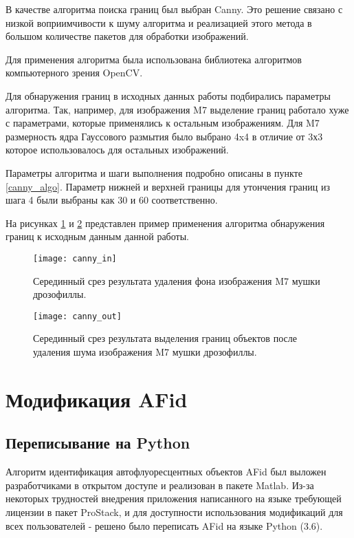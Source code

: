 В качестве алгоритма поиска границ был выбран Canny. Это решение связано с низкой воприимчивости к шуму алгоритма и реализацией этого метода в большом количестве пакетов для обработки изображений.

Для применения алгоритма была использована библиотека алгоритмов компьютерного зрения OpenCV. \cite{Booklet}

Для обнаружения границ в исходных данных работы подбирались параметры алгоритма. Так, например, для изображения M7 выделение границ работало хуже с параметрами, которые применялись к остальным изображениям. Для M7 размерность ядра Гауссового размытия было выбрано 4x4 в отличие от 3х3 которое использовалось для остальных изображений.

Параметры алгоритма и шаги выполнения подробно описаны в пункте \ref{canny_algo}. Параметр нижней и верхней границы для утончения границ из шага 4 были выбраны как 30 и 60 соответственно.

На рисунках \ref{canny_in} и \ref{canny_out} представлен пример применения алгоритма обнаружения границ к исходным данным данной работы.

\begin{figure}[H]
	\centering
	\texttt{[image: canny\_in]}
	\caption{Серединный срез результата удаления фона изображения M7 мушки дрозофиллы.}
	\label{canny_in}
\end{figure}

\begin{figure}[H]
	\centering
	\texttt{[image: canny\_out]}
	\caption{Серединный срез результата выделения границ объектов после удаления шума изображения M7 мушки дрозофиллы.}
	\label{canny_out}
\end{figure}




\section{Модификация AFid} \label{ch3:sec1}

\subsection{Переписывание на Python}
Алгоритм идентификация автофлуоресцентных объектов AFid был выложен разработчиками в открытом доступе и реализован в пакете Matlab. Из-за некоторых трудностей внедрения приложения написанного на языке требующей лицензии в пакет ProStack, и для доступности использования модификаций для всех пользователей - решено было переписать AFid на языке Python (3.6). %

